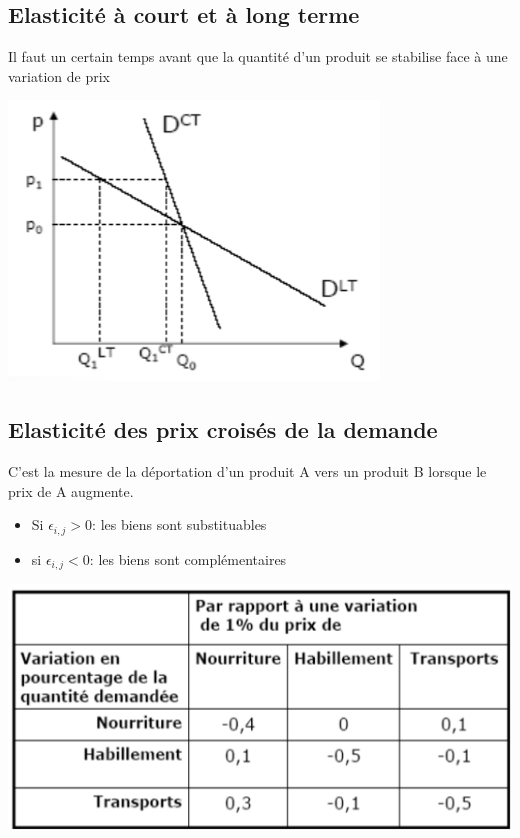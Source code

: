 \subsection{Elasticité à court et à long terme}
Il faut un certain  temps avant que la quantité d'un produit se stabilise face à une variation de prix
\begin{center}
    \includegraphics[scale = 1]{Pics/elasticite_court_et_long_terme.png}
\end{center}
\newpage
\subsection{Elasticité des prix croisés de la demande}
C'est la mesure de la déportation d'un produit A vers un produit B lorsque le prix de A augmente.
\begin{center}
    \huge{}
\end{center}
\begin{itemize}
    \item Si $\epsilon_{i,j} > 0 $: les biens sont substituables
    \item si $\epsilon_{i,j} < 0 $: les biens sont complémentaires
\end{itemize}
\begin{center}
    \includegraphics[scale=0.8]{Pics/elasticite_prix_croises.png}
\end{center}
\newpage
